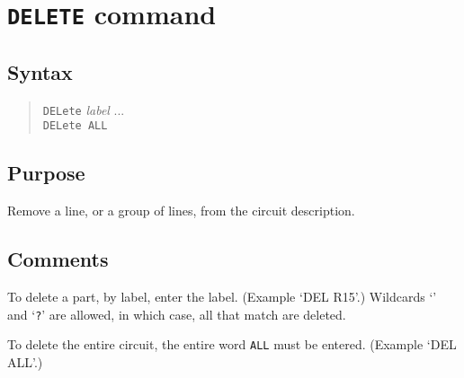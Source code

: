 %
%
%
%
\section{{\tt DELETE} command}
\subsection{Syntax}
\begin{verse}
{\tt DELete} {\it label} ...\\
{\tt DELete ALL}
\end{verse}
\subsection{Purpose}

Remove a line, or a group of lines, from the circuit description.
\subsection{Comments}

To delete a part, by label, enter the label.  (Example `DEL R15'.)
Wildcards `{\tt *}' and `{\tt ?}' are allowed, in which case, all that match
are deleted.

To delete the entire circuit, the entire word {\tt ALL} must be entered.
(Example `DEL ALL'.)

